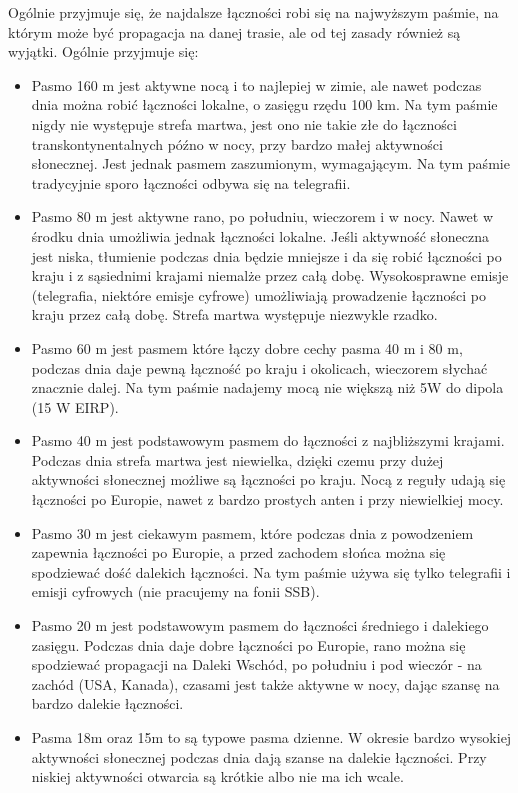 \documentclass[a4paper,12pt]{article}
\begin{document}
Ogólnie przyjmuje się, że najdalsze łączności robi się na najwyższym paśmie, na którym może być propagacja na danej trasie, ale od tej zasady również są wyjątki. Ogólnie przyjmuje się:
\begin{itemize}
 \item Pasmo 160 m jest aktywne nocą i to najlepiej w zimie, ale nawet podczas dnia można robić łączności lokalne, o zasięgu rzędu 100 km. Na tym paśmie nigdy nie występuje strefa martwa, jest ono nie takie złe do łączności transkontynentalnych późno w nocy, przy bardzo małej aktywności słonecznej. Jest jednak pasmem zaszumionym, wymagającym. Na tym paśmie tradycyjnie sporo łączności odbywa się na telegrafii.
 \item Pasmo 80 m jest aktywne rano, po południu, wieczorem i w nocy. Nawet w środku dnia umożliwia jednak łączności lokalne. Jeśli aktywność słoneczna jest niska, tłumienie podczas dnia będzie mniejsze i da się robić łączności po kraju i z sąsiednimi krajami niemalże przez całą dobę. Wysokosprawne emisje (telegrafia, niektóre emisje cyfrowe) umożliwiają prowadzenie łączności po kraju przez całą dobę. Strefa martwa występuje niezwykle rzadko.
\item Pasmo 60 m jest pasmem które łączy dobre cechy pasma 40 m i 80 m, podczas dnia daje pewną łączność po kraju i okolicach, wieczorem słychać znacznie dalej. Na tym paśmie nadajemy mocą nie większą niż 5W do dipola (15 W EIRP).
\item Pasmo 40 m jest podstawowym pasmem do łączności z najbliższymi krajami. Podczas dnia strefa martwa jest niewielka, dzięki czemu przy dużej aktywności słonecznej możliwe są łączności po kraju. Nocą z reguły udają się łączności po Europie, nawet z bardzo prostych anten i przy niewielkiej mocy.
\item Pasmo 30 m jest ciekawym pasmem, które podczas dnia z powodzeniem zapewnia łączności po Europie, a przed zachodem słońca można się spodziewać dość dalekich łączności. Na tym paśmie używa się tylko telegrafii i emisji cyfrowych (nie pracujemy na fonii SSB).
\item Pasmo 20 m jest podstawowym pasmem do łączności średniego i dalekiego zasięgu. Podczas dnia daje dobre łączności po Europie, rano można się spodziewać propagacji na Daleki Wschód, po południu i pod wieczór - na zachód (USA, Kanada), czasami jest także aktywne w nocy, dając szansę na bardzo dalekie łączności.
 \item Pasma 18m oraz 15m to są typowe pasma dzienne. W okresie bardzo wysokiej aktywności słonecznej podczas dnia dają szanse na dalekie łączności. Przy niskiej aktywności otwarcia są krótkie albo nie ma ich wcale.

\end{itemize}
\end{document}
